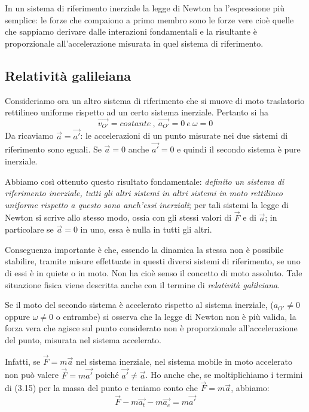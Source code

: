 \documentclass[class=book, crop=false, oneside, 12pt]{standalone}
\begin{document}
In un sistema di riferimento inerziale la legge di Newton ha l'espressione più semplice: 
le forze che compaiono a primo membro sono le forze vere cioè quelle che sappiamo derivare dalle interazioni fondamentali e la risultante è proporzionale all'accelerazione  misurata in quel sistema di riferimento. 

\subsection{Relatività galileiana}

Consideriamo ora un altro sistema di riferimento che si muove di moto traslatorio rettilineo uniforme rispetto ad un certo sistema inerziale. 
Pertanto si ha 
\begin{equation}
    \overrightarrow{v_{O'}} = costante \ , \ \overrightarrow{a_{O'}} = 0 \ e \ \omega = 0
\end{equation}
Da ricaviamo \(\overrightarrow{a} = \overrightarrow{a'}\): le accelerazioni di un punto misurate nei due sistemi di riferimento sono eguali. 
Se \(\overrightarrow{a} = 0\) anche \(\overrightarrow{a'}= 0\) e quindi il secondo sistema è pure inerziale. 

Abbiamo così ottenuto questo risultato fondamentale: \emph{definito un sistema di riferimento inerziale, tutti gli altri sistemi in altri sistemi in moto rettilineo uniforme rispetto a questo sono anch'essi inerziali};
per tali sistemi la legge di Newton si scrive allo stesso modo, ossia con gli stessi valori di \(\overrightarrow{F}\) e di \(\overrightarrow{a}\); in particolare se \(\overrightarrow{a} = 0\) in uno, essa è nulla in tutti gli altri.

Conseguenza importante è che, essendo la dinamica la stessa non è possibile stabilire, tramite misure effettuate in questi diversi sistemi di riferimento, se uno di essi è in quiete o in moto. 
Non ha cioè senso il concetto di moto assoluto. 
Tale situazione fisica viene descritta anche con il termine di \emph{relatività galileiana}.

Se il moto del secondo sistema è accelerato rispetto al sistema inerziale, (\(a_{O'} \neq 0\) oppure \(\omega \neq 0\) o entrambe) si osserva che la legge di Newton non è più valida, la forza vera che agisce sul punto considerato non è proporzionale all'accelerazione del punto, misurata nel sistema accelerato.

Infatti, se \(\overrightarrow{F} = m \overrightarrow{a}\) nel sistema inerziale, nel sistema mobile in moto accelerato non può valere \(\overrightarrow{F} = m \overrightarrow{a'}\) poiché \( \overrightarrow{a'} \neq \overrightarrow{a}\).
Ho anche che, se moltiplichiamo i termini di (3.15) per la massa del punto e teniamo conto che \(\overrightarrow{F} = m \overrightarrow{a}\), abbiamo:
\begin{equation}
    \overrightarrow{F} - m \overrightarrow{a_t} - m \overrightarrow{a_c} = m \overrightarrow{a'}
\end{equation}
\end{document}
